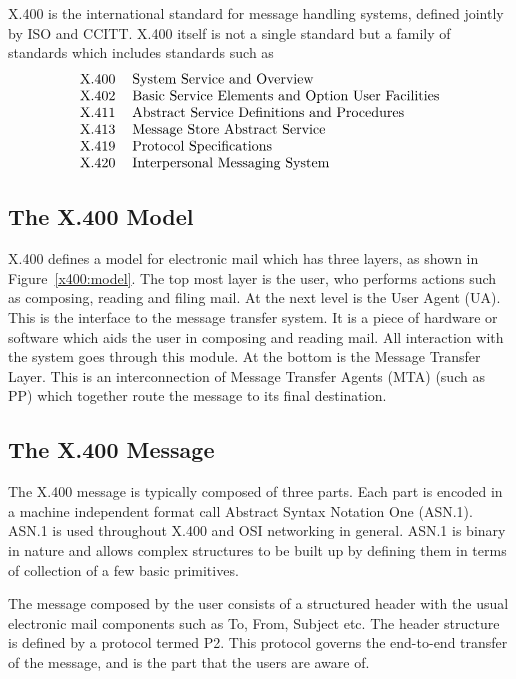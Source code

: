 X.400 is the international standard for message handling systems,
defined jointly by ISO and CCITT. X.400 itself is not a single
standard but a family of standards which includes standards such as
\[\begin{tabular}{l l}
X.400&	System Service and Overview\\
X.402&	Basic Service Elements and Option User Facilities\\ 
X.411&	Abstract Service Definitions and Procedures\\
X.413&	Message Store Abstract Service\\
X.419&	Protocol Specifications\\
X.420&	Interpersonal Messaging System\\
\end{tabular}\]

\subsection{The X.400 Model}

X.400 defines a model for electronic mail which has three layers, as
shown in Figure~\ref{x400:model}. The top most layer is the user, who
performs actions such as composing, reading and filing mail. At the
next level is the User Agent (UA). This is the interface to the
message transfer system. It is a piece of hardware or software which
aids the user in composing and reading mail. All interaction with the
system goes through this module. At the bottom is the Message Transfer
Layer. This is an interconnection of Message Transfer Agents (MTA) (such
as PP) which together route the message to its final destination.


\subsection{The X.400 Message}

The X.400 message is typically composed of three parts. Each part is
encoded in a machine independent format call Abstract Syntax Notation
One (ASN.1). ASN.1 is used throughout X.400 and OSI networking in
general. ASN.1 is binary in nature and allows complex structures to be
built up by defining them in terms of collection of a few basic primitives.

The message composed by the user consists of a structured header with
the usual electronic mail components such as To, From, Subject etc.
The header structure is defined by a protocol
termed P2. This protocol governs the end-to-end transfer of the
message, and is the part that the users are aware of.


